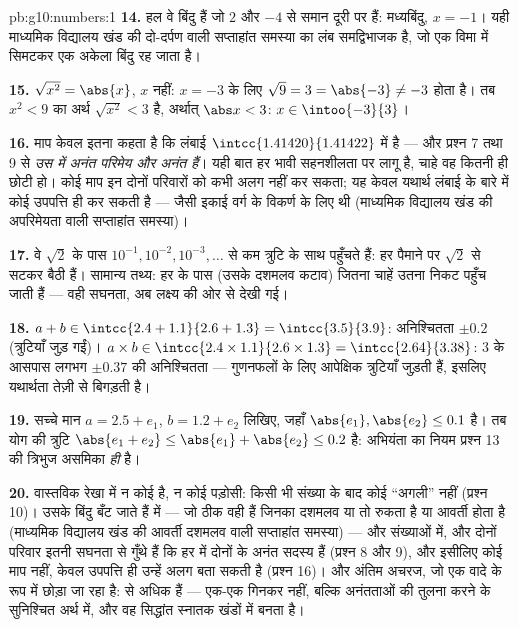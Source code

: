 \begin{solution}{pb:g10:numbers:1}
\textbf{14.} हल वे बिंदु हैं जो $2$ और $-4$ से समान दूरी पर हैं:
मध्यबिंदु, $x = -1$। यही माध्यमिक विद्यालय खंड की दो-दर्पण वाली सप्ताहांत
समस्या का लंब समद्विभाजक है, जो एक विमा में सिमटकर एक अकेला बिंदु रह जाता
है।

\textbf{15.} $\sqrt{x^2} = \abs{x}$, $x$ नहीं: $x = -3$ के लिए $\sqrt{9} = 3 = \abs{-3} \neq -3$ होता है। तब $x^2 < 9$ का अर्थ
$\sqrt{x^2} < 3$ है, अर्थात् $\abs x < 3$: $x \in \intoo{-3}{3}$।

\textbf{16.} माप केवल इतना कहता है कि लंबाई  $\intcc{1.41420}{1.41422}$ में है --- और
प्रश्न 7 तथा 9 से \emph{उस  में अनंत परिमेय और अनंत 
हैं}। यही बात हर भावी सहनशीलता पर लागू है, चाहे वह कितनी ही छोटी हो। कोई
माप इन दोनों परिवारों को कभी अलग नहीं कर सकता; यह केवल यथार्थ लंबाई के बारे
में कोई उपपत्ति ही कर सकती है --- जैसी इकाई वर्ग के विकर्ण के लिए थी
(माध्यमिक विद्यालय खंड की अपरिमेयता वाली सप्ताहांत समस्या)।

\textbf{17.} वे $\sqrt2$ के पास $10^{-1}, 10^{-2}, 10^{-3}, \dots$ से कम त्रुटि के साथ पहुँचते हैं: हर
पैमाने पर  $\sqrt2$ से सटकर बैठी हैं। सामान्य तथ्य: हर  के पास  (उसके दशमलव कटाव) जितना चाहें उतना निकट पहुँच
जाती हैं --- वही सघनता, अब लक्ष्य की ओर से देखी गई।

\textbf{18.} $a + b \in \intcc{2.4 + 1.1}{2.6 + 1.3} =
\intcc{3.5}{3.9}$: अनिश्चितता $\pm 0.2$ (त्रुटियाँ जुड़ गईं)। $a \times b \in \intcc{2.4 \times 1.1}{2.6 \times 1.3} =
\intcc{2.64}{3.38}$: $3$ के
आसपास लगभग $\pm 0.37$ की अनिश्चितता --- गुणनफलों के लिए आपेक्षिक त्रुटियाँ जुड़ती
हैं, इसलिए यथार्थता तेज़ी से बिगड़ती है।

\textbf{19.} सच्चे मान $a = 2.5 + e_1$, $b = 1.2 + e_2$ लिखिए, जहाँ $\abs{e_1}, \abs{e_2} \leq 0.1$ है। तब योग की त्रुटि
$\abs{e_1 + e_2} \leq \abs{e_1} +
\abs{e_2} \leq 0.2$ है: अभियंता का नियम प्रश्न 13 की त्रिभुज असमिका \emph{ही} है।

\textbf{20.} वास्तविक रेखा में न कोई  है, न कोई पड़ोसी: किसी भी संख्या
के बाद कोई ``अगली'' नहीं (प्रश्न 10)। उसके बिंदु बँट जाते हैं  में --- जो ठीक वही हैं जिनका दशमलव या तो रुकता है या आवर्ती होता
है (माध्यमिक विद्यालय खंड की आवर्ती दशमलव वाली सप्ताहांत समस्या) --- और
 संख्याओं में, और दोनों परिवार इतनी सघनता से गुँथे हैं कि हर 
में दोनों के अनंत सदस्य हैं (प्रश्न 8 और 9), और इसीलिए कोई माप नहीं, केवल
उपपत्ति ही उन्हें अलग बता सकती है (प्रश्न 16)। और अंतिम अचरज, जो एक वादे के
रूप में छोड़ा जा रहा है:   से अधिक हैं ---
एक-एक गिनकर नहीं, बल्कि अनंतताओं की तुलना करने के सुनिश्चित अर्थ में, और वह
सिद्धांत स्नातक खंडों में बनता है।
\end{solution}
